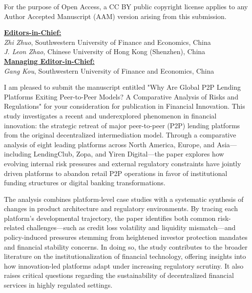 \documentclass{article}[a4paper]
\begin{document}
For the purpose of Open Access, a CC BY public copyright license applies to any Author Accepted Manuscript (AAM) version arising from this submission.

\newpage
\textbf{\underline{Editors-in-Chief:}}\\
\textit{Zhi Zhuo}, Southwestern University of Finance and Economics, China\\
\textit{J. Leon Zhao}, Chinese University of Hong Kong (Shenzhen), China\\

\noindent
\textbf{\underline{Managing Editor-in-Chief:}}\\
\textit{Gang Kou}, Southwestern University of Finance and Economics, China\\

\date{today}


I am pleased to submit the manuscript entitled "Why Are Global P2P Lending Platforms Exiting Peer-to-Peer Models? A Comparative Analysis of Risks and Regulations" for your consideration for publication in Financial Innovation. This study investigates a recent and underexplored phenomenon in financial innovation: the strategic retreat of major peer-to-peer (P2P) lending platforms from the original decentralized intermediation model. Through a comparative analysis of eight leading platforms across North America, Europe, and Asia—including LendingClub, Zopa, and Yiren Digital—the paper explores how evolving internal risk pressures and external regulatory constraints have jointly driven platforms to abandon retail P2P operations in favor of institutional funding structures or digital banking transformations.

The analysis combines platform-level case studies with a systematic synthesis of changes in product architecture and regulatory environments. By tracing each platform’s developmental trajectory, the paper identifies both common risk-related challenges—such as credit loss volatility and liquidity mismatch—and policy-induced pressures stemming from heightened investor protection mandates and financial stability concerns. In doing so, the study contributes to the broader literature on the institutionalization of financial technology, offering insights into how innovation-led platforms adapt under increasing regulatory scrutiny. It also raises critical questions regarding the sustainability of decentralized financial services in highly regulated settings.
\end{document}
